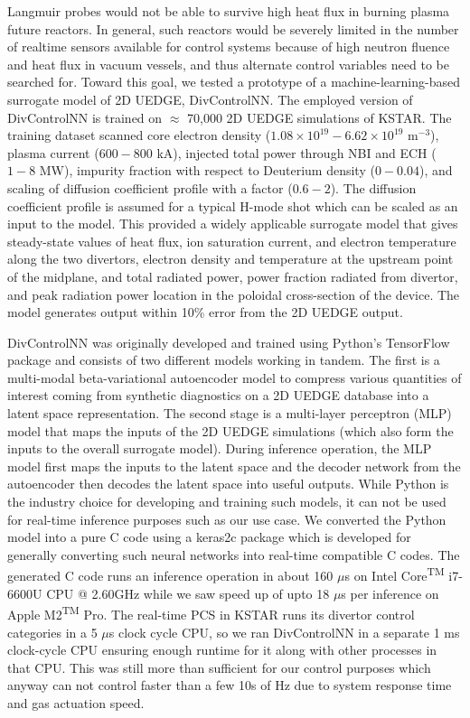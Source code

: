 Langmuir probes would not be able to survive high heat flux in burning plasma future reactors.
In general, such reactors would be severely limited in the number of realtime sensors available for control systems because of high neutron fluence and heat flux in vacuum vessels, and thus alternate control variables need to be searched for.
Toward this goal, we tested a prototype of a machine-learning-based surrogate model of 2D UEDGE, DivControlNN.
The employed version of DivControlNN is trained on $\approx$ 70,000 2D UEDGE simulations of KSTAR.
The training dataset scanned core electron density ($1.08 \times 10^{19} - 6.62 \times 10^{19}$ m$^{-3}$), plasma current ($600-800$ kA), injected total power through NBI and ECH ($1-8$ MW), impurity fraction with respect to Deuterium density ($0-0.04$), and scaling of diffusion coefficient profile with a factor ($0.6 - 2$).
The diffusion coefficient profile is assumed for a typical H-mode shot which can be scaled as an input to the model.
This provided a widely applicable surrogate model that gives steady-state values of heat flux, ion saturation current, and electron temperature along the two divertors, electron density and temperature at the upstream point of the midplane, and total radiated power, power fraction radiated from divertor, and peak radiation power location in the poloidal cross-section of the device.
The model generates output within 10\% error from the 2D UEDGE output.

DivControlNN was originally developed and trained using Python's TensorFlow package and consists of two different models working in tandem.
The first is a multi-modal beta-variational autoencoder\cite{Higgins_2017_ICLR} model to compress various quantities of interest coming from synthetic diagnostics on a 2D UEDGE database into a latent space representation.
The second stage is a multi-layer perceptron (MLP) model that maps the inputs of the 2D UEDGE simulations (which also form the inputs to the overall surrogate model).
During inference operation, the MLP model first maps the inputs to the latent space and the decoder network from the autoencoder then decodes the latent space into useful outputs.
While Python is the industry choice for developing and training such models, it can not be used for real-time inference purposes such as our use case.
We converted the Python model into a pure C code using a keras2c\cite{keras2c} package which is developed for generally converting such neural networks into real-time compatible C codes.
The generated C code runs an inference operation in about 160 $\mu$s on Intel\textsuperscript{\textregistered} Core\textsuperscript{TM} i7-6600U CPU @ 2.60GHz while we saw speed up of upto 18 $\mu$s per inference on Apple\textsuperscript{\textregistered} M2\textsuperscript{TM} Pro.
The real-time PCS in KSTAR runs its divertor control categories in a 5 $\mu$s clock cycle CPU, so we ran DivControlNN in a separate 1 ms clock-cycle CPU ensuring enough runtime for it along with other processes in that CPU.
This was still more than sufficient for our control purposes which anyway can not control faster than a few 10s of Hz due to system response time and gas actuation speed.

